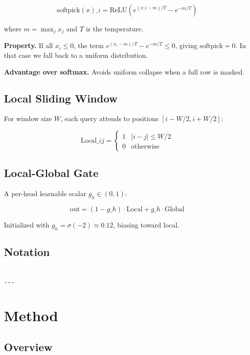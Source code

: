 \[
\text{softpick}(x)\_i = \text{ReLU}\!\left(e^{(x\_i - m)/T} - e^{-m/T}\right)
\tag{3.7}
\]

where $m = \max_j x_j$ and $T$ is the temperature.

\textbf{Property.} If all $x_i \leq 0$, the term $e^{(x_i - m)/T} - e^{-m/T} \leq 0$, 
giving $\text{softpick} = 0$. In that case we fall back to a uniform 
distribution.

\textbf{Advantage over softmax.} Avoids uniform collapse when a full row is 
masked.

\subsection{Local Sliding Window}

For window size $W$, each query attends to positions $[i - W/2, i + W/2]$:

\[
\text{Local}\_{ij} = \begin{cases} 1 & |i - j| \leq W/2 \\ 0 & \text{otherwise} \end{cases}
\tag{3.8}
\]

\subsection{Local-Global Gate}

A per-head learnable scalar $g_h \in (0, 1)$:

\[
\text{out} = (1 - g\_h) \cdot \text{Local} + g\_h \cdot \text{Global}
\tag{3.9}
\]

Initialized with $g_h = \sigma(-2) \approx 0.12$, biasing toward local.

\subsection{Notation}

\begin{lstlisting}

---
\end{lstlisting}

\section{Method}

\subsection{Overview}

